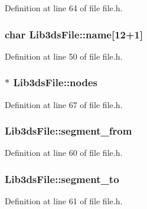 Definition at line 64 of file file.\-h.

\hypertarget{struct_lib3ds_file_adea1e1b486823093ed1c76586b6cc0aa}{
\subsubsection[{name}]{\setlength{\rightskip}{0pt plus 5cm}char Lib3ds\-File\-::name\mbox{[}12+1\mbox{]}}}\label{struct_lib3ds_file_adea1e1b486823093ed1c76586b6cc0aa}


Definition at line 50 of file file.\-h.

\hypertarget{struct_lib3ds_file_a78196fa94943379542c94c034fef5398}{
\subsubsection[{nodes}]{$\ast$ Lib3ds\-File\-::nodes}}\label{struct_lib3ds_file_a78196fa94943379542c94c034fef5398}


Definition at line 67 of file file.\-h.

\hypertarget{struct_lib3ds_file_ad76a7b0a44ca2100a10e18ef190c885e}{
\subsubsection[{segment\-\_\-from}]{ Lib3ds\-File\-::segment\-\_\-from}}\label{struct_lib3ds_file_ad76a7b0a44ca2100a10e18ef190c885e}


Definition at line 60 of file file.\-h.

\hypertarget{struct_lib3ds_file_a5f30923e3fbf000a2782d028d810805c}{
\subsubsection[{segment\-\_\-to}]{ Lib3ds\-File\-::segment\-\_\-to}}\label{struct_lib3ds_file_a5f30923e3fbf000a2782d028d810805c}


Definition at line 61 of file file.\-h.

